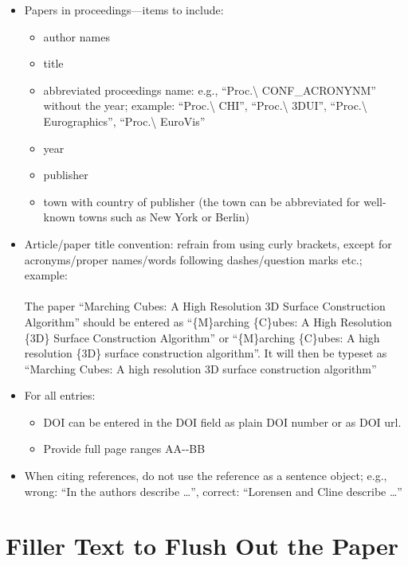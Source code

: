 \documentclass[journal]{vgtc}                %
\begin{document}
\begin{itemize}
  \item Papers in proceedings---items to include:
        \begin{itemize}
  	      \item author names
  	      \item title
  	      \item abbreviated proceedings name: e.g., ``Proc.\textbackslash{} CONF\_ACRONYNM'' without the year; example: ``Proc.\textbackslash{} CHI'', ``Proc.\textbackslash{} 3DUI'', ``Proc.\textbackslash{} Eurographics'', ``Proc.\textbackslash{} EuroVis''
  	      \item year
  	      \item publisher
  	      \item town with country of publisher (the town can be abbreviated for well-known towns such as New York or Berlin)
        \end{itemize}

  \item Article/paper title convention: refrain from using curly brackets, except for acronyms/proper names/words following dashes/question marks etc.; example:\\\\
        The paper ``Marching Cubes: A High Resolution 3D Surface Construction Algorithm'' should be entered as ``\{M\}arching \{C\}ubes: A High Resolution \{3D\} Surface Construction Algorithm'' or  ``\{M\}arching \{C\}ubes: A high resolution \{3D\} surface construction algorithm''.
        It will then be typeset as ``Marching Cubes: A high resolution 3D surface construction algorithm''
  \item For all entries:
        \begin{itemize}
  	      \item DOI can be entered in the DOI field as plain DOI number or as DOI url.
  	      \item Provide full page ranges AA-{}-BB
        \end{itemize}
  \item When citing references, do not use the reference as a sentence object; e.g., wrong: ``In \cite{Lorensen:1987:MCA} the authors describe \dots'', correct: ``Lorensen and Cline \cite{Lorensen:1987:MCA} describe \dots''
\end{itemize}


\section{Filler Text to Flush Out the Paper}
\end{document}
